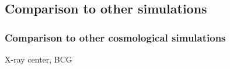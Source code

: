 
\subsection{Comparison to other simulations}
\subsubsection{Comparison to other cosmological simulations}
 

 
\cite{Cui2015} X-ray center, BCG
% 
% 
% 
